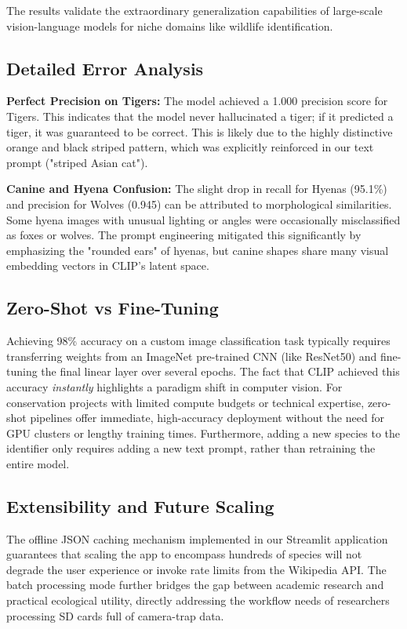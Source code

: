 \documentclass[11pt]{article}
\begin{document}
The results validate the extraordinary generalization capabilities of large-scale vision-language models for niche domains like wildlife identification.

\subsection{Detailed Error Analysis}
\textbf{Perfect Precision on Tigers:} The model achieved a 1.000 precision score for Tigers. This indicates that the model never hallucinated a tiger; if it predicted a tiger, it was guaranteed to be correct. This is likely due to the highly distinctive orange and black striped pattern, which was explicitly reinforced in our text prompt ("striped Asian cat").

\textbf{Canine and Hyena Confusion:} The slight drop in recall for Hyenas (95.1\%) and precision for Wolves (0.945) can be attributed to morphological similarities. Some hyena images with unusual lighting or angles were occasionally misclassified as foxes or wolves. The prompt engineering mitigated this significantly by emphasizing the "rounded ears" of hyenas, but canine shapes share many visual embedding vectors in CLIP's latent space.

\subsection{Zero-Shot vs Fine-Tuning}
Achieving 98\% accuracy on a custom image classification task typically requires transferring weights from an ImageNet pre-trained CNN (like ResNet50) and fine-tuning the final linear layer over several epochs. The fact that CLIP achieved this accuracy \textit{instantly} highlights a paradigm shift in computer vision. For conservation projects with limited compute budgets or technical expertise, zero-shot pipelines offer immediate, high-accuracy deployment without the need for GPU clusters or lengthy training times. Furthermore, adding a new species to the identifier only requires adding a new text prompt, rather than retraining the entire model.

\subsection{Extensibility and Future Scaling}
The offline JSON caching mechanism implemented in our Streamlit application guarantees that scaling the app to encompass hundreds of species will not degrade the user experience or invoke rate limits from the Wikipedia API. The batch processing mode further bridges the gap between academic research and practical ecological utility, directly addressing the workflow needs of researchers processing SD cards full of camera-trap data.
\end{document}
